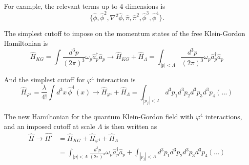 \noindent For example, the relevant terms up to 4 dimensions is 
\begin{equation}
\{ \hat{\phi}, \hat{\phi}^2, \nabla^2 \hat{\phi}, \hat{\pi}, \hat{\pi}^2, \hat{\phi}^3, \hat{\phi}^4 \}.
\end{equation}

\noindent The simplest cutoff to impose on the momentum states of the free Klein-Gordon Hamiltonian is
\begin{equation}
\hat{H}_{KG} = \int \frac{d^3 p}{(2\pi)^3} \omega_p \hat{a}_p^\dagger \hat{a}_p \to \hat{H}_{KG}+\hat{H}_\Lambda = \int_{|p|<\Lambda} \frac{d^3 p}{(2\pi)^3} \omega_p \hat{a}_p^\dagger \hat{a}_p
\end{equation}

\noindent And the simplest cutoff for $\varphi^4$ interaction is
\begin{equation}
\hat{H}_{\varphi^4} = \frac{\lambda}{4 !} \int d^3 x \, \hat{\phi}^4(x) \to \hat{H}_{\varphi^4} + \hat{H}_\Lambda = \int_{|p_j|<\Lambda} d^3 p_1 d^3 p_2 d^3 p_3 d^3 p_4 (\dots)
\end{equation}

\noindent The new Hamiltonian for the quantum Klein-Gordon field with $\varphi^4$ interactions, and an imposed cutoff at scale $\Lambda$ is then written as
\begin{align}
\hat{H} \to \hat{H'} &= \hat{H}_{KG} + \hat{H}_{\varphi^4} + \hat{H}_\Lambda \\
&= \int_{|p|<\Lambda} \frac{d^3 p}{(2\pi)^3} \omega_p \hat{a}_p^\dagger \hat{a}_p + \int_{|p_j|<\Lambda} d^3 p_1 d^3 p_2 d^3 p_3 d^3 p_4 (\dots)
\end{align}